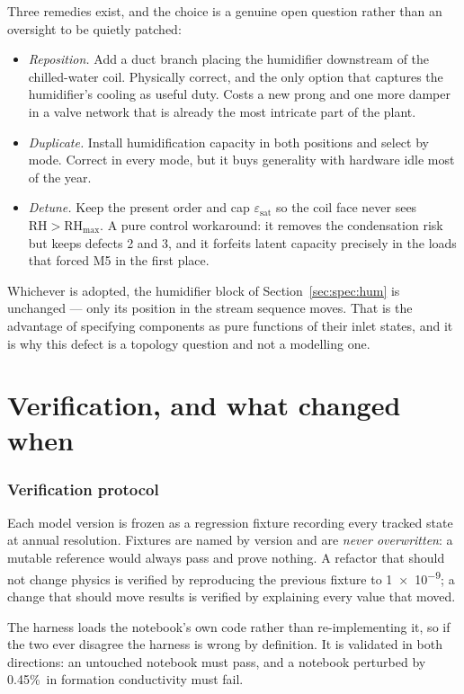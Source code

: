 \documentclass[11pt]{article}
\newcommand{\RH}{\ensuremath{\mathrm{RH}}}
\begin{document}
Three remedies exist, and the choice is a genuine open question rather than an oversight to be
quietly patched:
\begin{itemize}[nosep]
\item \emph{Reposition.} Add a duct branch placing the humidifier downstream of the chilled-water
coil. Physically correct, and the only option that captures the humidifier's cooling as useful duty.
Costs a new prong and one more damper in a valve network that is already the most intricate part of
the plant.
\item \emph{Duplicate.} Install humidification capacity in both positions and select by mode. Correct
in every mode, but it buys generality with hardware idle most of the year.
\item \emph{Detune.} Keep the present order and cap $\varepsilon_{\mathrm{sat}}$ so the coil face
never sees $\RH>\RH_{\max}$. A pure control workaround: it removes the condensation risk but keeps
defects 2 and 3, and it forfeits latent capacity precisely in the loads that forced M5 in the first
place.
\end{itemize}
Whichever is adopted, the humidifier block of Section~\ref{sec:spec:hum} is unchanged --- only its
position in the stream sequence moves. That is the advantage of specifying components as pure
functions of their inlet states, and it is why this defect is a topology question and not a modelling
one.


\part{Verification, and what changed when}

\section{Verification protocol}

Each model version is frozen as a regression fixture recording every tracked
state at annual resolution. Fixtures are named by version and are
\emph{never overwritten}: a mutable reference would always pass and prove
nothing. A refactor that should not change physics is verified by reproducing
the previous fixture to \num{1e-9}; a change that should move results is
verified by explaining every value that moved.

The harness loads the notebook's own code rather than re-implementing it, so
if the two ever disagree the harness is wrong by definition. It is validated in
both directions: an untouched notebook must pass, and a notebook perturbed by
0.45\%\ in formation conductivity must fail.
\end{document}
